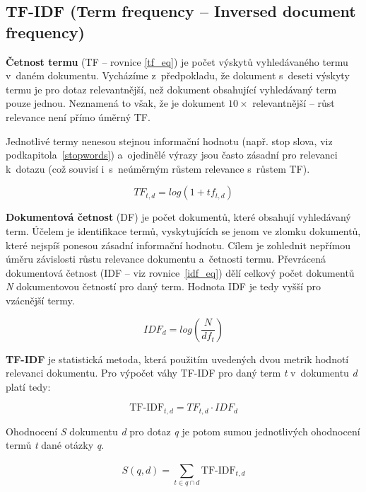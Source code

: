\subsection{TF-IDF (Term frequency -- Inversed document frequency)}
\label{tf-idf}

\textbf{Četnost termu} (TF -- rovnice \ref{tf_eq}) je počet výskytů vyhledávaného termu v~daném dokumentu. Vycházíme z~předpokladu, že dokument s~deseti výskyty termu je pro dotaz relevantnější, než dokument obsahující vyhledávaný term pouze jednou. Neznamená to však, že je dokument $10\times$  relevantnější -- růst relevance není přímo úměrný TF.\par
Jednotlivé termy nenesou stejnou informační hodnotu (např. stop slova, viz podkapitola~\ref{stopwords}) a~ojedinělé výrazy jsou často zásadní pro relevanci k~dotazu (což souvisí i~s~neúměrným růstem relevance s~růstem TF).\par

\begin{equation}
\label{tf_eq}
    TF_{t,d} = log(1+tf_{t,d})
\end{equation}

\textbf{Dokumentová četnost} (DF) je počet dokumentů, které obsahují vyhledávaný term. Účelem je identifikace termů, vyskytujících se jenom ve zlomku dokumentů, které nejspíš ponesou zásadní informační hodnotu. Cílem je zohlednit nepřímou úměru závislosti růstu relevance dokumentu a~četnosti termu. Převrácená dokumentová četnost  (IDF -- viz rovnice~\ref{idf_eq}) dělí celkový počet dokumentů \emph{N} dokumentovou četností pro daný term. Hodnota IDF je tedy vyšší pro vzácnější termy.\par

\begin{equation}
\label{idf_eq}
    IDF_{d} = log(\frac{N}{df_t})
\end{equation}

\textbf{TF-IDF} je statistická metoda, která použitím uvedených dvou metrik hodnotí relevanci dokumentu.
Pro výpočet váhy TF-IDF pro daný term \emph{t} v~dokumentu \emph{d} platí tedy:

\begin{equation}
    \text{TF-IDF}_{t,d} = TF_{t,d} \cdot IDF_d
\end{equation}

Ohodnocení \emph{S} dokumentu \emph{d} pro dotaz \emph{q} je potom sumou jednotlivých ohodnocení termů \emph{t} dané otázky \emph{q}.

\begin{equation}
    S(q,d) = \sum_{t\in{q \cap d}}^{}\text{TF-IDF}_{t,d}
\end{equation}

